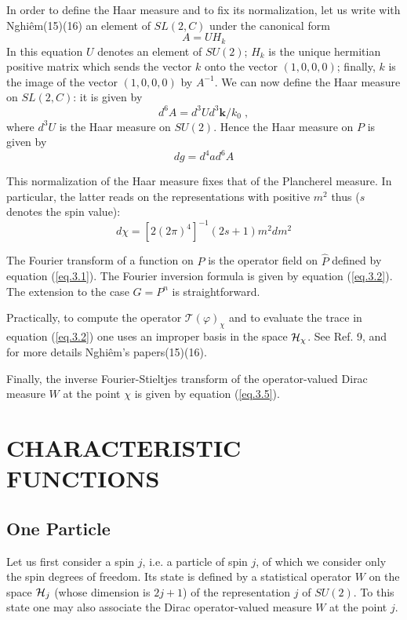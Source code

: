\documentclass[a4paper,11pt]{article}
\begin{document}
In order to define the Haar measure and to fix its normalization, let us write with Nghi\^em(15)(16)
an element of $SL(2,C)$ under the canonical form
$$
 A = U H_k
$$
 In this equation $U$ denotes an 
element of $SU(2)$; $H_k$ is the unique hermitian positive matrix which sends the vector $k$ 
onto the 
vector $(1,0,0,0)$; finally, $k$ is the image of the vector $(1,0,0,0)$ by $A^{-1}$. We can now 
define the Haar measure on $SL(2,C)$: it is given by
$$
  d^6 A = d^3 U d^3 \mathbf{k} / k_0  \;,
$$
where $d^3 U$ is the Haar measure on $SU(2)$. Hence the Haar measure on $P$ is given by
\begin{equation}
 \label{eq.3.10}
  dg = d^4 a d^6 A
\end{equation}

This normalization of the Haar measure fixes that of the Plancherel measure. In particular, 
the latter reads on the representations with positive $m^2$ thus ($s$ denotes the spin value):
\begin{equation}
 \label{eq.3.11}
  d\chi = [2(2\pi)^4]^{-1} (2s+1) m^2 dm^2
\end{equation}

The Fourier transform of a function on $P$ is the operator field on $\widehat{P}$ defined by 
equation (\ref{eq.3.1}). 
The Fourier inversion formula is given by equation (\ref{eq.3.2}). The extension to the case 
$G=P^n$ is straightforward. 

Practically, to compute the operator $\mathcal{T}(\varphi)_{\chi}$ and to evaluate the trace in 
equation (\ref{eq.3.2}) one uses 
an improper basis in the space $\mathcal{H}_{\chi}$. See Ref. 9, and for more details Nghi\^em's 
papers(15)(16). 

Finally, the inverse Fourier-Stieltjes transform of the operator-valued Dirac measure $W$ at 
the point $\chi$ is given by equation (\ref{eq.3.5}).

\section{CHARACTERISTIC FUNCTIONS}

\subsection{One Particle}

Let us first consider a spin $j$, i.e. a particle of spin $j$, of which we consider only the 
spin 
degrees of freedom. Its state is defined by a statistical operator $W$ on the space $\mathcal{H}_j$ 
(whose 
dimension is $2j+1$) of the representation $j$ of $SU(2)$. To this state one may also associate 
the Dirac operator-valued measure $W$ at the point $j$. 
\end{document}
